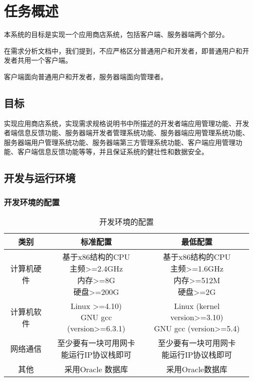 \chapter{任务概述}
本系统的目标是实现一个应用商店系统，包括客户端、服务器端两个部分。

在需求分析文档中，我们提到，不应严格区分普通用户和开发者，即普通用户和开发者共用一个客户端。

客户端面向普通用户和开发者，服务器端面向管理者。

\section{目标}
实现应用商店系统，实现需求规格说明书中所描述的开发者端应用管理功能、开发者端信息反馈功能、服务器端开发者管理系统功能、服务器端应用管理系统功能、服务器端用户管理系统功能、服务器端第三方管理系统功能、客户端应用管理功能、客户端信息反馈功能等等，并且保证系统的健壮性和数据安全。

\section{开发与运行环境}

\subsection{开发环境的配置}
\begin{table}[htbp]
\centering
\caption{开发环境的配置} \label{tab:development-environment}
\begin{tabular}{|c|c|c|}
    \hline
    类别 & 标准配置 & 最低配置 \\
    \hline
    计算机硬件 & \tabincell{c}{基于x86结构的CPU\\ 主频>=2.4GHz\\ 内存>=8G\\ 硬盘>=200G} & \tabincell{c}{基于x86结构的CPU\\ 主频>=1.6GHz\\ 内存>=512M\\ 硬盘>=2G} \\
    \hline
    计算机软件 & \tabincell{c}{Linux >=4.10)\\ GNU gcc (version>=6.3.1)} & \tabincell{c}{Linux (kernel version>=3.10)\\ GNU gcc (version>=5.4)} \\
    \hline
    网络通信 & \tabincell{c}{至少要有一块可用网卡\\ 能运行IP协议栈即可} & \tabincell{c}{至少要有一块可用网卡\\ 能运行IP协议栈即可} \\
    \hline
    其他 & 采用Oracle 数据库 & 采用Oracle数据库 \\
    \hline
\end{tabular}
\end{table}

